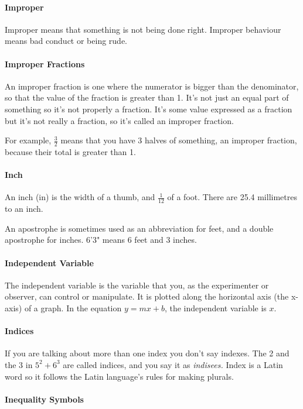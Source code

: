 \documentclass[12pt]{article}
\begin{document}
\paragraph{Improper} Improper means that something is not being done right. Improper behaviour means bad conduct or being rude.

\paragraph{Improper Fractions}
An improper fraction is one where the numerator is bigger than the denominator, so that the value of the fraction is greater than 1. It's not just an equal part of something so it's not properly a fraction. It's some value expressed as a fraction but it's not really a fraction, so it's called an improper fraction.

For example, $\frac{3}{2}$ means that you have 3 halves of something, an improper fraction, because their total is greater than 1.

\paragraph{Inch}
An inch (in) is the width of a thumb, and $\frac{1}{12}$ of a foot. There are 25.4 millimetres to an inch.

An apostrophe is sometimes used as an abbreviation for feet, and a double apostrophe for inches. 6'3" means 6 feet and 3 inches.

\paragraph{Independent Variable}
The independent variable is the variable that you, as the experimenter or observer, can control or manipulate. It is plotted along the horizontal axis (the x-axis) of a graph. In the equation \( y = mx + b \), the independent variable is \( x \).

\paragraph{Indices}
If you are talking about more than one index you don’t say indexes. The 2 and the 3 in $5^2+6^3$ are called indices, and you say it as \textit{indisees.} Index is  a Latin word so it follows the Latin language's rules for making plurals.

\paragraph{Inequality Symbols}
\end{document}
